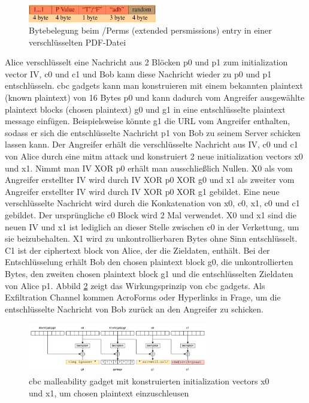 \begin{figure}[!htb]
	\centering
	\includegraphics[width=0.5\textwidth]{"images/perms-ccc-break-pdf.png"}
	\caption{Bytebelegung beim /Perms (extended persmissions) entry in einer verschlüsselten PDF-Datei \cite{ccc-break-pdf}}
	\label{fig:perms}
\end{figure}

Alice verschlüsselt eine Nachricht aus 2 Blöcken p0 und p1 zum initialization vector IV, c0 und c1 und Bob kann diese Nachricht wieder zu p0 und p1 entschlüsseln. \gls{cbc} gadgets kann man konstruieren mit einem bekannten plaintext (known plaintext) von 16 Bytes p0 und kann dadurch vom Angreifer ausgewählte plaintext blocks (chosen plaintext) g0 und g1 in eine entschlüsselte plaintext message einfügen. Beispielsweise könnte g1 die URL vom Angreifer enthalten, sodass er sich die entschlüsselte Nachricht p1 von Bob zu seinem Server schicken lassen kann. Der Angreifer erhält die verschlüsselte Nachricht aus IV, c0 und c1 von Alice durch eine \gls{mitm} attack und konstruiert 2 neue initialization vectors x0 und x1. Nimmt man IV XOR p0 erhält man ausschließlich Nullen. X0 als vom Angreifer erstellter IV wird durch IV XOR p0 XOR g0 und x1 als zweiter vom Angreifer erstellter IV wird durch IV XOR p0 XOR g1 gebildet. Eine neue verschlüsselte Nachricht wird durch die Konkatenation von x0, c0, x1, c0 und c1 gebildet. Der ursprüngliche c0 Block wird 2 Mal verwendet. X0 und x1 sind die neuen IV und x1 ist lediglich an dieser Stelle zwischen c0 in der Verkettung, um sie beizubehalten. X1 wird zu unkontrollierbaren Bytes ohne Sinn entschlüsselt. C1 ist der ciphertext block von Alice, der die Zieldaten, enthält. Bei der Entschlüsselung erhält Bob den chosen plaintext block g0, die unkontrollierten Bytes, den zweiten chosen plaintext block g1 und die entschlüsselten Zieldaten von Alice p1. Abbild \ref{fig:gadget} zeigt das Wirkungsprinzip von \gls{cbc} gadgets. Als Exfiltration Channel kommen AcroForms oder Hyperlinks in Frage, um die entschlüsselte Nachricht von Bob zurück an den Angreifer zu schicken. \cite{gadget, ccc-break-pdf, crypto-web}
\par

\begin{figure}[!htb]
	\centering
	\includegraphics[width=0.7\textwidth]{"images/gadget2-gadget.png"}
	\caption{\gls{cbc} malleability gadget mit konstruierten initialization vectors x0 und x1, um chosen plaintext einzuschleusen \cite{gadget}}
	\label{fig:gadget}
\end{figure}

